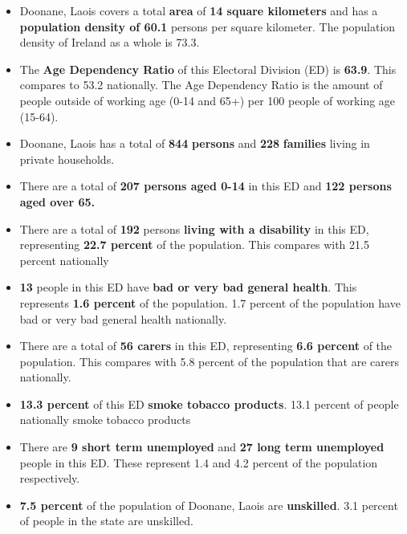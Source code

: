\documentclass{article}
\begin{document}
\begin{itemize}

\item Doonane, Laois covers a total \textbf{area} of  \textbf{14 square kilometers} and has a \textbf{population density of 60.1} persons per square kilometer. The population density of Ireland as a whole is  73.3. 

\item The \textbf{Age Dependency Ratio} of this Electoral Division (ED) is  \textbf{63.9}. This compares to 53.2 nationally. The Age Dependency Ratio is the amount of people outside of working age (0-14 and 65+) per 100 people of working age (15-64). 

\item Doonane, Laois has a total of \textbf{844} \textbf{persons} and  \textbf{228} \textbf{families} living in private households.

\item There are a total of \textbf{207 persons aged 0-14} in this ED and \textbf{122 persons aged over 65.} 

\item There are a total of \textbf{192} persons \textbf{living with a disability} in this ED, representing \textbf{22.7 percent} of the population. This compares with  21.5 percent nationally

\item \textbf{13} people in this ED have \textbf{bad or very bad general health}. This represents \textbf{1.6 percent} of the population. 1.7 percent of the population have bad or very bad general health nationally. 

\item There are a total of \textbf{56 carers} in this ED, representing \textbf{6.6 percent} of the population. This compares with 5.8 percent of the population that are carers nationally. 

\item \textbf{13.3 percent} of this ED \textbf{smoke tobacco products}. 13.1 percent of people nationally smoke tobacco products

\item There are \textbf{9 short term unemployed} and \textbf{27 long term unemployed} people in this ED. These represent 1.4 and 4.2 percent of the population respectively.

\item  \textbf{7.5 percent} of the population of Doonane, Laois are \textbf{unskilled}. 3.1 percent of people in the state are unskilled.


\end{itemize}
\end{document}
